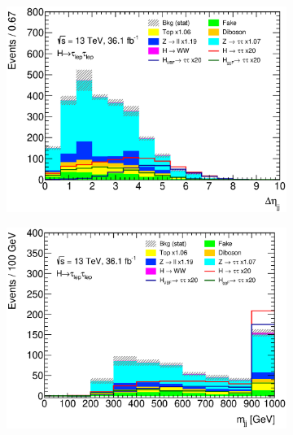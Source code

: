 \begin{figure}[htb]
\begin{subfigure}[t]{0.45\textwidth}
        \includegraphics[width=\textwidth]{./plots/event_selection/categories/ll-CutVBFCatOppositeHemispheres-DJetEta-lin.eps}
        \caption{}\label{fig:event_selection:cutflow:vbf:detajj}
    \end{subfigure}
    \begin{subfigure}[t]{0.45\textwidth}
        \includegraphics[width=\textwidth]{./plots/event_selection/categories/ll-CutVBFCatLCentrality-Mjj-lin.eps}
        \caption{}\label{fig:event_selection:cutflow:vbf:mjj}
    \end{subfigure}
    \begin{subfigure}[t]{0.45\textwidth}

\end{subfigure}
\end{figure}

